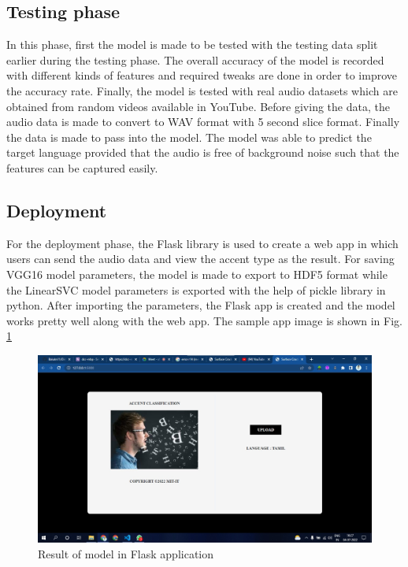 \documentclass[pdflatex]{sn-jnl}%
\theoremstyle{thmstyleone}%
\theoremstyle{thmstyletwo}%
\theoremstyle{thmstylethree}%
\begin{document}
\subsection{Testing phase}
In this phase, first the model is made to be tested with the testing data
split earlier during the testing phase. The overall accuracy of the model is recorded with different kinds of features and required tweaks are done in order to improve the accuracy rate. Finally, the model is tested with real audio datasets which are obtained from random videos available in YouTube. Before giving the data, the audio data is made to convert to WAV format with 5 second slice format. Finally the data is made to pass into the model. The model was able to predict the target language provided that the audio is free of background noise such that the features can be captured easily. 

\subsection{Deployment}
For the deployment phase, the Flask library is used to
create a web app in which users can send the audio data and
view the accent type as the result. For saving VGG16 model
parameters, the model is made to export to HDF5 format while
the LinearSVC model parameters is exported with the help of
pickle library in python. After importing the parameters, the
Flask app is created and the model works pretty well along
with the web app. The sample app image is shown in Fig. \ref{app-1}

\begin{figure}[htbp]
	\centerline{\includegraphics[scale=0.25]{app-1.jpg}}
	\caption{Result of model in Flask application}
	\label{app-1}
\end{figure}
\end{document}
